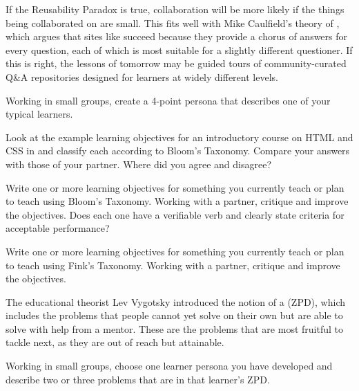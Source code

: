 If the Reusability Paradox is true,
collaboration will be more likely
if the things being collaborated on are small.
This fits well with Mike Caulfield's theory of
,
which argues that sites like  succeed because
they provide a chorus of answers for every question,
each of which is most suitable for a slightly different questioner.
If this is right,
the lessons of tomorrow may be guided tours of community-curated Q\&A repositories
designed for learners at widely different levels.



Working in small groups,
create a 4-point persona that describes one of your typical learners.


Look at the example learning objectives
for an introductory course on HTML and CSS in 
and classify each according to Bloom's Taxonomy.
Compare your answers with those of your partner.
Where did you agree and disagree?


Write one or more learning objectives
for something you currently teach or plan to teach
using Bloom's Taxonomy.
Working with a partner,
critique and improve the objectives.
Does each one have a verifiable verb
and clearly state criteria for acceptable performance?


Write one or more learning objectives
for something you currently teach or plan to teach
using Fink's Taxonomy.
Working with a partner,
critique and improve the objectives.


The educational theorist Lev Vygotsky introduced the notion of a  (ZPD),
which includes the problems that people cannot yet solve on their own
but are able to solve with help from a mentor.
These are the problems that are most fruitful to tackle next,
as they are out of reach but attainable.

Working in small groups,
choose one learner persona you have developed
and describe two or three problems that are in that learner's ZPD.


